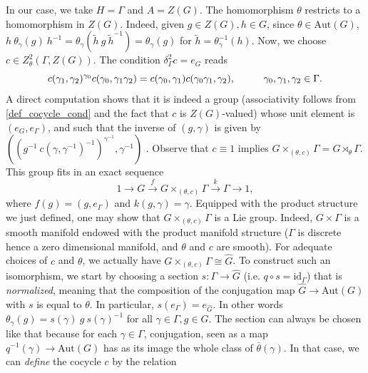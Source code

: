In our case, we take \(H=\Gamma\) and \(A=Z(G)\). The homomorphism \(\theta\) restricts to a homomorphism in \(Z(G)\). Indeed, given \(g\in Z(G), h \in G\), since \(\theta\in \mathrm{Aut}(G)\), \(h\ \theta_\gamma(g) \ h^{-1} = \theta_\gamma(\tilde{h} \ g \ \tilde{h}^{-1})=\theta_\gamma(g)\) for \(\tilde{h}=\theta_\gamma^{-1}(h)\). Now, we choose \(c \in Z^2_\theta(\Gamma, Z(G))\). The condition \(\delta_\Gamma^2c=e_G\) reads
\begin{equation} \label{def_cocycle_cond}
c(\gamma_1, \gamma_2)^{\gamma_0}c(\gamma_0, \gamma_1 \gamma_2)=c(\gamma_0, \gamma_1)c(\gamma_0\gamma_1, \gamma_2), \hspace{1 cm} \gamma_0, \gamma_1, \gamma_2 \in \Gamma.
\end{equation}
A direct computation shows that it is indeed a group (associativity follows from \eqref{def_cocycle_cond} and the fact that \(c\) is \(Z(G)\)-valued) whose unit element is \((e_G, e_\Gamma)\), and such that the inverse of \((g, \gamma)\) is given by \(((g^{-1}\ c(\gamma, \gamma^{-1})^{-1})^{\gamma^{-1}} , \gamma^{-1})\) \parencite[Lemma 18.1.9]{hilgert2011structure}. Observe that \(c\equiv 1\) implies \(G\times_{(\theta, c)}\Gamma=G \rtimes_\theta \Gamma\). This group fits in an exact sequence
\[
1 \to G \xrightarrow{f} G \times_{(\theta, c)} \Gamma \xrightarrow{k} \Gamma \to 1,
\]
where \(f(g)=(g, e_\Gamma)\) and \(k(g,\gamma)=\gamma\). Equipped with the product structure we just defined, one may show that \(G \times_{(\theta, c)}\Gamma\) is a Lie group. Indeed, \(G \times \Gamma\) is a smooth manifold endowed with the product manifold structure (\(\Gamma\) is discrete hence a zero dimensional manifold, and \(\theta\) and \(c\) are smooth). For adequate choices of \(c\) and \(\theta\), we actually have \(G \times_{(\theta, c)} \Gamma \cong \hat{G}\). To construct such an isomorphism, we start by choosing a section \(s\colon \Gamma \to \hat{G}\) (i.e. \(q \circ s=\mathrm{id}_\Gamma\)) that is \textit{normalized}, meaning that the composition of the conjugation map \(\hat{G} \to \mathrm{Aut}(G)\) with \(s\) is equal to \(\theta\). In particular, \(s(e_\Gamma)=e_{\hat{G}}\). In other words \(\theta_\gamma(g)=s(\gamma)\ g \ s(\gamma)^{-1}\) for all \(\gamma \in \Gamma, g \in G\). The section can always be chosen like that because for each \(\gamma \in \Gamma\), conjugation, seen as a map \(q^{-1}(\gamma) \to \mathrm{Aut}(G)\) has as its image the whole class of \(\bar{\theta}(\gamma)\). In that case, we can \textit{define} the cocycle \(c\) by the relation 
